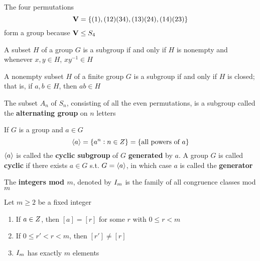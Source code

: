 \documentclass[11pt]{article}
\begin{document}
The four permutations
\begin{equation*}
\operatorname{\textbf{V}}=\{(1),(1 2)(3 4),(1 3)(2 4),(1 4)(2 3)\}
\end{equation*}
form a group because \(\operatorname{\textbf{V}}\le S_4\)

\begin{proposition}[]
A subset \(H\) of a group \(G\) is a subgroup if and only if \(H\) is nonempty and
whenever \(x,y\in H\), \(xy^{-1}\in H\)
\end{proposition}

\begin{proposition}[]
A nonempty subset \(H\) of a finite group \(G\) is a subgroup if and only if \(H\)
is closed; that is, if \(a,b\in H\), then \(ab\in H\)
\end{proposition}

\begin{examplle}[]
The subset \(A_n\) of \(S_n\), consisting of all the even permutations, is a
subgroup called the \textbf{alternating group} on \(n\) letters
\end{examplle}

\begin{definition}[]
If \(G\) is a group and \(a\in G\)
\begin{equation*}
\langle a\rangle=\{a^n:n\in\relax{Z}\}=\{\text{all powers of } a\}
\end{equation*}
\(\langle a\rangle\) is called the \textbf{cyclic subgroup} of \(G\) \textbf{generated} by \(a\). A
group \(G\) is called \textbf{cyclic} if there exists \(a\in G\) s.t. \(G=\langle a\rangle\),
in which case \(a\) is called the \textbf{generator}
\end{definition}

\begin{definition}[]
The \textbf{integers mod \(m\)}, denoted by \(\relax{I}_m\) is the family of all congruence
classes mod \(m\)
\end{definition}


\begin{proposition}[]
Let \(m\ge 2\) be a fixed integer
\begin{enumerate}
\item If \(a\in \relax{Z}\), then \([a]=[r]\) for some \(r\) with \(0\le r<m\)
\item If \(0\le r'<r<m\), then \([r']\neq[r]\)
\item \(\relax{I}_m\) has exactly \(m\) elements
\end{enumerate}
\end{proposition}
\end{document}
